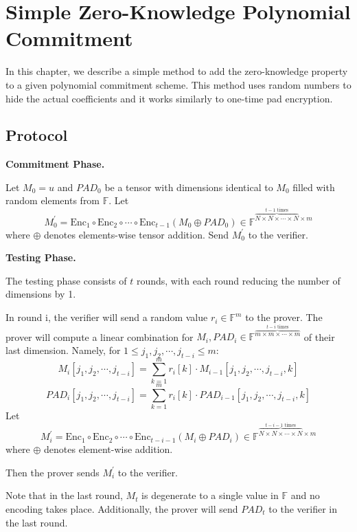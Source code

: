 \chapter{Simple Zero-Knowledge Polynomial Commitment}

In this chapter, we describe a simple method to add the zero-knowledge property to a given polynomial commitment scheme. This method uses random numbers to hide the actual coefficients and it works similarly to one-time pad encryption.

\section{Protocol}

\textbf{Commitment Phase.}

Let $M_0 = u$ and $PAD_0$ be a tensor with dimensions identical to $M_0$ filled with random elements from $\mathbb{F}$.
Let 
$$
    M_0^{\prime} = \text{Enc}_1 \circ \text{Enc}_2 \circ \cdots \circ \text{Enc}_{t-1} (M_0 \oplus PAD_0) \in \mathbb{F}^{\overbrace{N \times N \times \cdots \times N}^{t-1 \text{ times}} \times m}
$$
where $\oplus$ denotes elements-wise tensor addition.
Send $M_0^{\prime}$ to the verifier.

\textbf{Testing Phase.}

The testing phase consists of $t$ rounds, with each round reducing the number of dimensions by 1.

In round i, the verifier will send a random value $r_i \in \mathbb{F}^m$ to the prover.
The prover will compute a linear combination for $M_i, PAD_i \in \mathbb{F}^{\overbrace{m \times m \times \cdots \times m}^{t-i \text{ times}}}$ of their last dimension.
Namely, for $1 \le j_1,j_2, \cdots, j_{t-i} \le m$:
$$
    M_i[j_1,j_2, \cdots, j_{t-i}] = \sum_{k=1}^{m} r_{i}[k] \cdot M_{i-1}[j_1,j_2, \cdots, j_{t-i}, k]
$$
$$
    PAD_i[j_1,j_2, \cdots, j_{t-i}] = \sum_{k=1}^{m} r_{i}[k] \cdot PAD_{i-1}[j_1,j_2, \cdots, j_{t-i}, k]
$$
Let 
$$
M_i^\prime = \text{Enc}_1 \circ \text{Enc}_2 \circ \cdots \circ \text{Enc}_{t - i - 1}(M_i \oplus PAD_i)\in \mathbb{F}^{\overbrace{N \times N \times \cdots \times N}^{t-i-1 \text{ times}} \times m}
$$
where $\oplus$ denotes element-wise addition.

Then the prover sends $M_i^{\prime}$ to the verifier.

Note that in the last round, $M_t$ is degenerate to a single value in $\mathbb{F}$ and no encoding takes place. Additionally, the prover will send $PAD_t$ to the verifier in the last round. 

